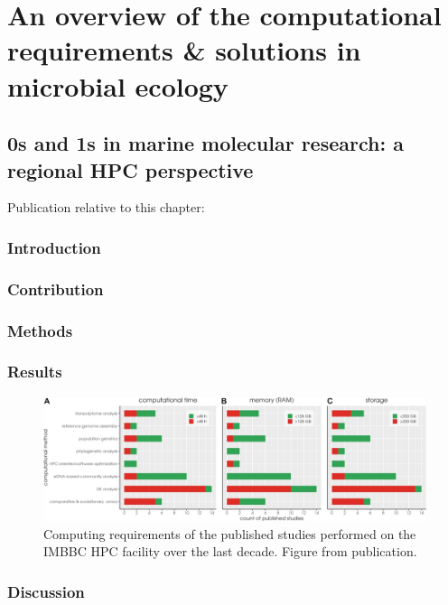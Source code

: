 % 
% 

\chapter{
   An overview of the computational requirements \& solutions in microbial ecology
}
\label{cha:hpc}




\section{
   0s and 1s in marine molecular research: a regional HPC perspective 
}


   Publication relative to this chapter: \cite{zafeiropoulos20210s}

\subsection{Introduction}


\subsection{Contribution}

\subsection{Methods}

\subsection{Results}



\begin{figure}[h]
   \centering
   \includegraphics[width=140mm]{figures/zorbas_jobs_resources.jpeg}
   \caption{Computing requirements of the published studies performed on the IMBBC HPC facility over the last decade. Figure from publication.
   }
   \label{fig:zorba_jobs}
\end{figure}


\subsection{Discussion}








